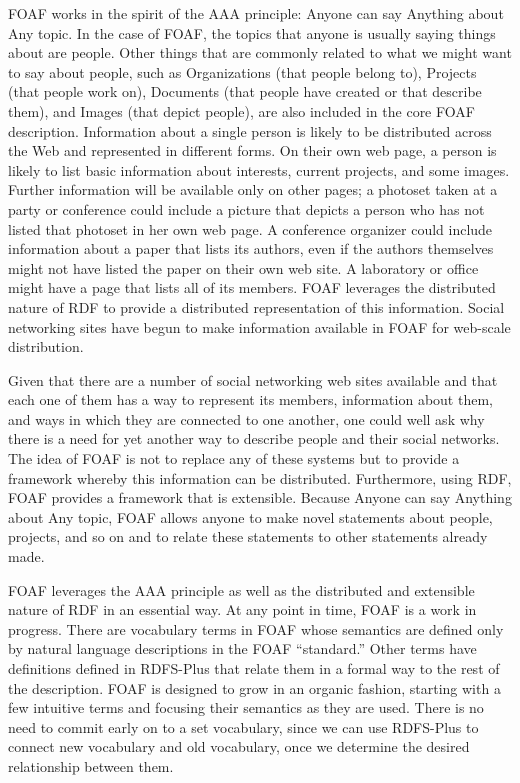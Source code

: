 FOAF works in the spirit of the AAA principle: Anyone can say Anything
about Any topic. In the case of FOAF, the topics that anyone is usually
saying things about are people. Other things that are commonly related
to what we might want to say about people, such as Organizations (that
people belong to), Projects (that people work on), Documents (that
people have created or that describe them), and Images (that depict
people), are also included in the core FOAF description. Information
about a single person is likely to be distributed across the Web and
represented in different forms. On their own web page, a person is
likely to list basic information about interests, current projects, and
some images. Further information will be available only on other pages;
a photoset taken at a party or conference could include a picture that
depicts a person who has not listed that photoset in her own web page. A
conference organizer could include information about a paper that lists
its authors, even if the authors themselves might not have listed the
paper on their own web site. A laboratory or office might have a page
that lists all of its members. FOAF leverages the distributed nature of
RDF to provide a distributed representation of this information. Social
networking sites have begun to make information available in FOAF for
web-scale distribution.

Given that there are a number of social networking web sites available
and that each one of them has a way to represent its members,
information about them, and ways in which they are connected to one
another, one could well ask why there is a need for yet another way to
describe people and their social networks. The idea of FOAF is not to
replace any of these systems but to provide a framework whereby this
information can be distributed. Furthermore, using RDF, FOAF provides a
framework that is extensible. Because Anyone can say Anything about Any
topic, FOAF allows anyone to make novel statements about people,
projects, and so on and to relate these statements to other statements
already made.

FOAF leverages the AAA principle as well as the distributed and
extensible nature of RDF in an essential way. At any point in time, FOAF
is a work in progress. There are vocabulary terms in FOAF whose
semantics are defined only by natural language descriptions in the FOAF
``standard.'' Other terms have definitions defined in RDFS-Plus that
relate them in a formal way to the rest of the description. FOAF is
designed to grow in an organic fashion, starting with a few intuitive
terms and focusing their semantics as they are used. There is no need to
commit early on to a set vocabulary, since we can use RDFS-Plus to
connect new vocabulary and old vocabulary, once we determine the desired
relationship between them.

